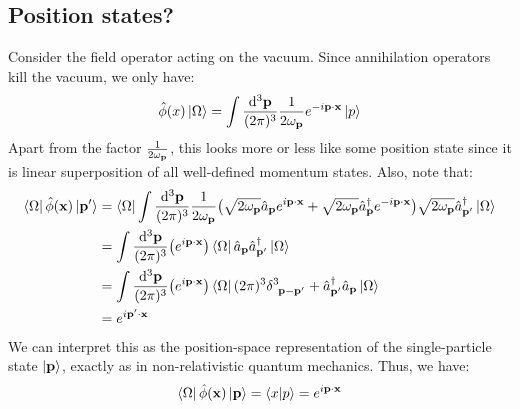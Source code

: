 \subsection{Position states?}
Consider the field operator acting on the vacuum. Since annihilation operators kill the vacuum, we only have:
$$\hat{\phi}(x)\ket{\Omega} = \int \frac{\dd^3\vb{{\vb{p}}}}{(2\pi)^3}\frac{1}{2\omega_{\vb{{p}}}} e^{-i \vb{p}\cdot \vb{x}}\ket{p}$$
Apart from the factor $\frac{1}{2\omega_{\vb{{p}}}}$, this looks more or less like some position state since it is linear superposition of all well-defined momentum states. Also, note that:
\begin{align*}
   \bra{\Omega}\hat{\phi}(\vb{x})\ket{\vb{p}'} &= \bra{\Omega} \int \meas{\vb{p}} \frac{1}{2\omp} \qty(\sqrt{2\omp}\annp e^{i \vb{p}\cdot \vb{x}} + \sqrt{2\omp}\crep e^{-i \vb{p}\cdot \vb{x}} ) \sqrt{2\omp} \crepd \vac \\
   &=  \int \meas{\vb{p}} \qty( e^{i \vb{p}\cdot \vb{x}} )  \bra{\Omega} \annp\crepd \vac\\
   &=\int \meas{\vb{p}} \qty( e^{i \vb{p}\cdot \vb{x}} )  \bra{\Omega} (2\pi)^3\delt{3}{\vb{p}-\vb{p}'} + \crepd \annp \vac\\
   &=e^{i \vb{p}'\cdot \vb{x}}
\end{align*}
We can interpret this as the position-space representation of the single-particle state $\ket{\vb{p}}$, exactly as in non-relativistic quantum mechanics. Thus, we have:
$$\bra{\Omega}\hat{\phi}(\vb{x})\ket{\vb{p}} = \braket{x|p} = e^{i \vb{p}\cdot \vb{x}}$$